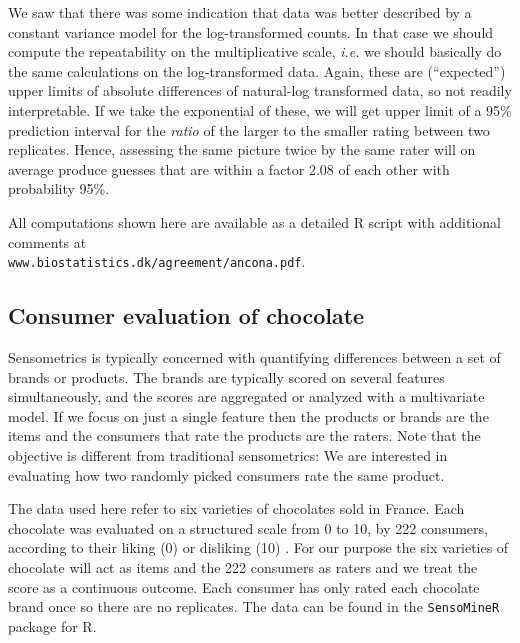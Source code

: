 \documentclass[aoas]{imsart}
\makeatletter
\newcommand{\R}{\textsf{R}\@\xspace}
\newcommand{\pkg}[1]{\texttt{#1}\@\xspace}
\newcommand{\ie}{\emph{i.e.}\@\xspace}
\makeatother
\begin{document}

We saw that there was some indication that data was better described
by a constant variance model for the log-transformed counts. In that
case we should compute the repeatability on the multiplicative scale,
\ie we should basically do the same calculations on the
log-transformed data.  Again, these are (``expected'') upper limits of
absolute differences of natural-log transformed data, so not readily
interpretable. If we take the exponential of these, we will get upper
limit of a 95\% prediction interval for the \emph{ratio} of the larger
to the smaller rating between two replicates.
Hence, assessing the same picture twice by the same rater will on
average produce guesses that are within a factor 2.08 of each other with
probability 95\%.


All computations shown here are available as a detailed \R script with
additional comments at \\ \verb+www.biostatistics.dk/agreement/ancona.pdf+.


\subsection{Consumer evaluation of chocolate}




Sensometrics is typically concerned with quantifying differences
between a set of brands or products. The brands are typically scored
on several features simultaneously, and the scores are aggregated or
analyzed with a multivariate model. If we focus on just a single feature
then the products or brands are the items and the consumers that rate
the products are the raters. Note that the objective is different from
traditional sensometrics: We are interested in evaluating how two
randomly picked consumers rate the same product.

The data used here refer to six varieties of chocolates sold in
France. Each chocolate was evaluated on a structured scale from 0 to
10, by 222 consumers, according to their liking (0) or disliking (10)
\citep{SensoMineR}. For our purpose the six varieties of chocolate will
act as items and the 222 consumers as raters and we treat the score as
a continuous outcome. Each consumer has only rated each chocolate
brand once so there are no replicates. The data can be found in the
\pkg{SensoMineR} package for \R.
\end{document}
